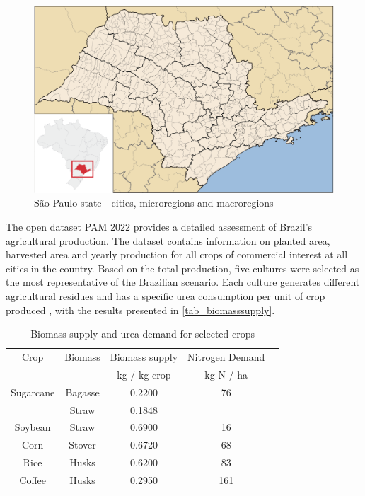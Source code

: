\documentclass[a4paper, titlepage]{article}
\begin{document}
\begin{figure}
	\includegraphics[width=\textwidth]{img/saopaulo_microregions.png}
	\caption{São Paulo state - cities, microregions and macroregions}
	\label{img_microregions}
\end{figure}

The open dataset PAM 2022 \cite{IBGEPAMProducao} provides a detailed assessment of Brazil's agricultural production.
The dataset contains information on planted area, harvested area and yearly production for all crops of commercial
interest at all cities in the country. Based on the total production, five cultures were selected as the most
representative of the Brazilian scenario. Each culture generates different agricultural residues
 \cite{souzaTheoreticalTechnicalAssessment2021} and has a specific urea consumption per unit of crop produced 
 \cite{IFASTATFertilizerUse}, with the results presented in \autoref{tab_biomasssupply}. 

\begin{table}
	\centering
	\caption{Biomass supply and urea demand for selected crops}
	\label{tab_biomasssupply}
	\begin{tabular}{|c | c | c | c | c|}
		\hline
		Crop & Biomass & Biomass supply \cite{souzaTheoreticalTechnicalAssessment2021} & Nitrogen Demand \cite{IFASTATFertilizerUse} \\
		 & & kg / kg crop & kg N / ha \\
		 \hline
		Sugarcane & Bagasse & 0.2200 & 76 \\ 
		 & Straw & 0.1848 &  \\
		Soybean & Straw & 0.6900 & 16 \\
		Corn & Stover & 0.6720 & 68 \\
		Rice & Husks & 0.6200 & 83 \\
		Coffee & Husks & 0.2950 & 161 \\
		\hline
	\end{tabular}
\end{table}
\end{document}
